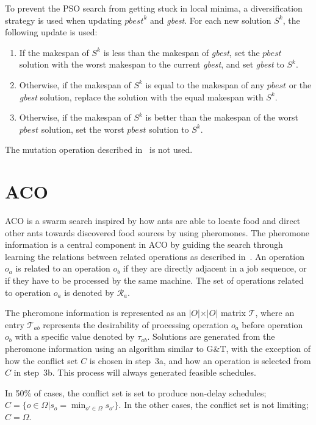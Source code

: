 \documentclass[paper=a4, fontsize=9pt]{scrartcl}
\begin{document}
\begin{multicols}{2}
To prevent the \ac{PSO} search from getting stuck in local minima, a diversification strategy is used when updating $\textit{pbest}^k$ and \textit{gbest}. For each new solution $S^k$, the following update is used:

\begin{enumerate}
    \item If the makespan of $S^k$ is less than the makespan of \textit{gbest}, set the $\textit{pbest}$ solution with the worst makespan to the current \textit{gbest}, and set \textit{gbest} to $S^k$.
    \item Otherwise, if the makespan of $S^k$ is equal to the makespan of any $\textit{pbest}$ or the \textit{gbest} solution, replace the solution with the equal makespan with $S^k$.
    \item Otherwise, if the makespan of $S^k$ is better than the makespan of the worst $\textit{pbest}$ solution, set the worst $\textit{pbest}$ solution to $S^k$.
\end{enumerate}

The mutation operation described in~\cite{sha2006hybrid} is not used.

\section*{\acl{ACO}}

\acf{ACO} is a swarm search inspired by how ants are able to locate food and direct other ants towards discovered food sources by using pheromones. The pheromone information is a central component in \ac{ACO} by guiding the search through learning the relations between related operations as described in~\cite{blum2004ant}. An operation $o_a$ is related to an operation $o_b$ if they are directly adjacent in a job sequence, or if they have to be processed by the same machine. The set of operations related to operation $o_a$ is denoted by $\mathcal{R}_a$.

The pheromone information is represented as an $\vert O \vert \times \vert O \vert$ matrix $\mathcal{T}$, where an entry $\mathcal{T}_{ab}$ represents the desirability of processing operation $o_a$ before operation $o_b$ with a specific value denoted by $\tau_{ab}$. Solutions are generated from the pheromone information using an algorithm similar to G\&T, with the exception of how the conflict set $C$ is chosen in step~3a, and how an operation is selected from $C$ in step~3b. This process will always generated feasible schedules.

In 50\% of cases, the conflict set is set to produce non-delay schedules; $C = \{o \in \Omega \vert s_o = \min_{o' \in \Omega} s_{o'}\}$. In the other cases, the conflict set is not limiting; $C = \Omega$.


\end{multicols}
\end{document}
